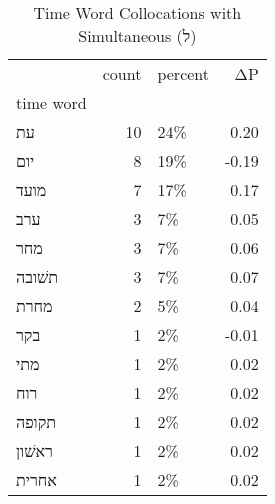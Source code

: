 \begin{table}[htbp!]
\centering
\caption{Time Word Collocations with Simultaneous (ל)}
\label{table:simל_head_cpd}
\begin{tabular}{lrlr}
\toprule
{} &  count & percent &    ΔP \\
time word &        &         &       \\
\midrule
עת        &     10 &     24\% &  0.20 \\
יום       &      8 &     19\% & -0.19 \\
מועד      &      7 &     17\% &  0.17 \\
ערב       &      3 &      7\% &  0.05 \\
מחר       &      3 &      7\% &  0.06 \\
תשׁובה    &      3 &      7\% &  0.07 \\
מחרת      &      2 &      5\% &  0.04 \\
בקר       &      1 &      2\% & -0.01 \\
מתי       &      1 &      2\% &  0.02 \\
רוח       &      1 &      2\% &  0.02 \\
תקופה     &      1 &      2\% &  0.02 \\
ראשׁון    &      1 &      2\% &  0.02 \\
אחרית     &      1 &      2\% &  0.02 \\
\bottomrule
\end{tabular}
\end{table}
